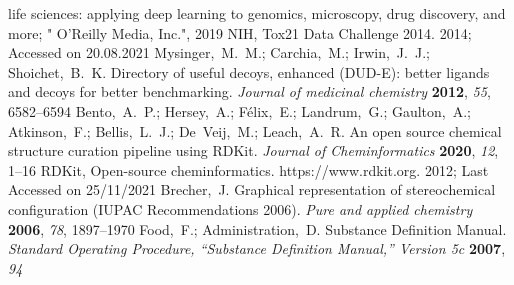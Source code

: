 \documentclass[journal=jcisd8,manuscript=article]{achemso} %
\begin{document}
\begin{mcitethebibliography}{34}
{  life sciences: applying deep learning to genomics, microscopy, drug
  discovery, and more}; " O'Reilly Media, Inc.", 2019\relax
\mciteBstWouldAddEndPuncttrue
\mciteSetBstMidEndSepPunct{\mcitedefaultmidpunct}
{\mcitedefaultendpunct}{\mcitedefaultseppunct}\relax
\EndOfBibitem
{}
NIH, Tox21 Data Challenge 2014. 2014; Accessed on 20.08.2021\relax
\mciteBstWouldAddEndPuncttrue
\mciteSetBstMidEndSepPunct{\mcitedefaultmidpunct}
{\mcitedefaultendpunct}{\mcitedefaultseppunct}\relax
\EndOfBibitem
{}
Mysinger,~M.~M.; Carchia,~M.; Irwin,~J.~J.; Shoichet,~B.~K. Directory of useful
  decoys, enhanced (DUD-E): better ligands and decoys for better benchmarking.
  \emph{Journal of medicinal chemistry} \textbf{2012}, \emph{55},
  6582--6594\relax
\mciteBstWouldAddEndPuncttrue
\mciteSetBstMidEndSepPunct{\mcitedefaultmidpunct}
{\mcitedefaultendpunct}{\mcitedefaultseppunct}\relax
\EndOfBibitem
{}
Bento,~A.~P.; Hersey,~A.; F{\'e}lix,~E.; Landrum,~G.; Gaulton,~A.;
  Atkinson,~F.; Bellis,~L.~J.; De~Veij,~M.; Leach,~A.~R. An open source
  chemical structure curation pipeline using RDKit. \emph{Journal of
  Cheminformatics} \textbf{2020}, \emph{12}, 1--16\relax
\mciteBstWouldAddEndPuncttrue
\mciteSetBstMidEndSepPunct{\mcitedefaultmidpunct}
{\mcitedefaultendpunct}{\mcitedefaultseppunct}\relax
\EndOfBibitem
{}
RDKit, Open-source cheminformatics. https://www.rdkit.org. 2012; Last Accessed
  on 25/11/2021\relax
\mciteBstWouldAddEndPuncttrue
\mciteSetBstMidEndSepPunct{\mcitedefaultmidpunct}
{\mcitedefaultendpunct}{\mcitedefaultseppunct}\relax
\EndOfBibitem
{}
Brecher,~J. Graphical representation of stereochemical configuration (IUPAC
  Recommendations 2006). \emph{Pure and applied chemistry} \textbf{2006},
  \emph{78}, 1897--1970\relax
\mciteBstWouldAddEndPuncttrue
\mciteSetBstMidEndSepPunct{\mcitedefaultmidpunct}
{\mcitedefaultendpunct}{\mcitedefaultseppunct}\relax
\EndOfBibitem
{}
Food,~F.; Administration,~D. Substance Definition Manual. \emph{Standard
  Operating Procedure, “Substance Definition Manual,” Version 5c}
  \textbf{2007}, \emph{94}\relax
\mciteBstWouldAddEndPuncttrue
\mciteSetBstMidEndSepPunct{\mcitedefaultmidpunct}
{\mcitedefaultendpunct}{\mcitedefaultseppunct}\relax
\EndOfBibitem

\end{mcitethebibliography}
\end{document}

